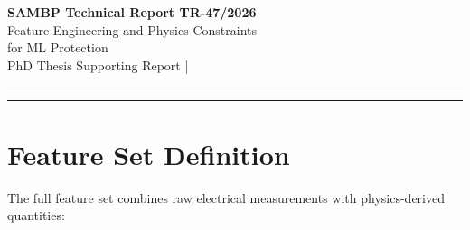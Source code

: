 \documentclass[11pt,a4paper]{article}
\begin{document}
\begin{center}
  {\LARGE\bfseries\color{sambpblue} SAMBP Technical Report TR-47/2026}\\[6pt]
  {\large Feature Engineering and Physics Constraints\\
    for ML Protection}\\[10pt]
  {\normalsize PhD Thesis Supporting Report \quad|}
\end{center}

\vspace{2pt}\hrule\vspace{8pt}

\begin{abstract}
\noindent
This report performs a systematic feature engineering study for the PINN
four-class fault classifier from TR-46.  Permutation-based importance
(Study A) identifies $\alpha$, $k_\mathrm{ibr}$, and $R_\mathrm{arc}$ as
the three informative features; five physics-derived features ($Z_m$,
$Z_\mathrm{ratio}$, $k_\mathrm{margin}$, $\alpha_\mathrm{margin}$,
$I_2/I_1$) carry zero incremental importance because they are deterministic
functions of the raw inputs.  Study B confirms that a physics-only feature
set achieves only 79.7\% accuracy vs 100\% for the full raw set, due to
information loss in the reconstruction step.  Study C reveals class-specific
feature signatures: MISS has the lowest $k_\mathrm{ibr}$ (0.046\,pu) and
zero $k_\mathrm{margin}$; EXT is uniquely identified by $\alpha>1.0$.
Study D establishes the minimum effective set as 2 features
($k_\mathrm{ibr}+\alpha$, 85.5\% accuracy), with $R_\mathrm{arc}$
providing the additional 14.5\,pp.  Study E demonstrates 85.3\% robustness
under complete CT loss with mean-value imputation, compared to 100\% with
full sensors.
\end{abstract}

\vspace{4pt}\hrule\vspace{10pt}

\section{Feature Set Definition}
\label{sec:features}

The full feature set combines raw electrical measurements with physics-derived
quantities:
\end{document}
